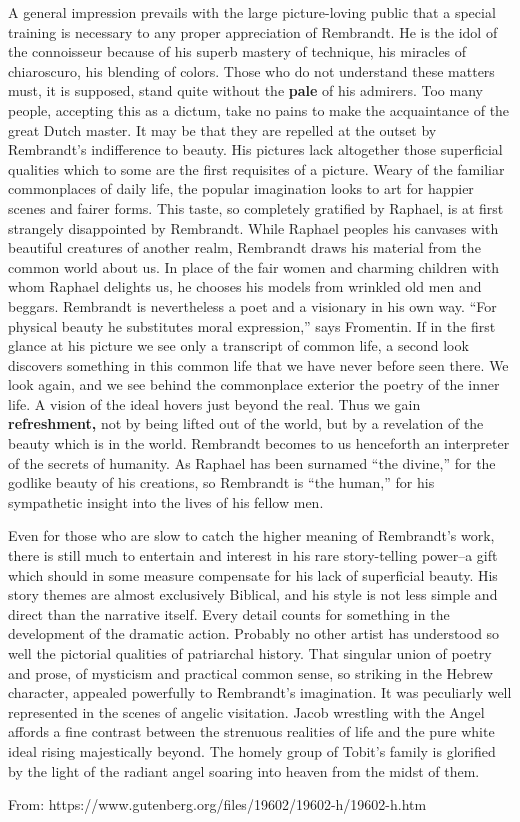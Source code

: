 \bigskip
\begin{linenumbers}
\modulolinenumbers[5]
\indent A general impression prevails with the large picture-loving public that a special training is necessary to any proper appreciation of Rembrandt. He is the idol of the connoisseur because of his superb mastery of technique, his miracles of chiaroscuro, his blending of colors. Those who do not understand these matters must, it is supposed, stand quite without the \textbf{pale} of his admirers. Too many people, accepting this as a dictum, take no pains to make the acquaintance of the great Dutch master. It may be that they are repelled at the outset by Rembrandt's indifference to beauty. His pictures lack altogether those superficial qualities which to some are the first requisites of a picture. Weary of the familiar commonplaces of daily life, the popular imagination looks to art for happier scenes and fairer forms. This taste, so completely gratified by Raphael, is at first strangely disappointed by Rembrandt. While Raphael peoples his canvases with beautiful creatures of another realm, Rembrandt draws his material from the common world about us. In place of the fair women and charming children with whom Raphael delights us, he chooses his models from wrinkled old men and beggars. Rembrandt is nevertheless a poet and a visionary in his own way. ``For physical beauty he substitutes moral expression,'' says Fromentin. If in the first glance at his picture we see only a transcript of common life, a second look discovers something in this common life that we have never before seen there. We look again, and we see behind the commonplace exterior the poetry of the inner life. A vision of the ideal hovers just beyond the real. Thus we gain \textbf{refreshment,} not by being lifted out of the world, but by a revelation of the beauty which is in the world. Rembrandt becomes to us henceforth an interpreter of the secrets of humanity. As Raphael has been surnamed ``the divine,'' for the godlike beauty of his creations, so Rembrandt is ``the human,'' for his sympathetic insight into the lives of his fellow men.

\indent Even for those who are slow to catch the higher meaning of Rembrandt's work, there is still much to entertain and interest in his rare story-telling power--a gift which should in some measure compensate for his lack of superficial beauty. His story themes are almost exclusively Biblical, and his style is not less simple and direct than the narrative itself. Every detail counts for something in the development of the dramatic action. Probably no other artist has understood so well the pictorial qualities of patriarchal history. That singular union of poetry and prose, of mysticism and practical common sense, so striking in the Hebrew character, appealed powerfully to Rembrandt's imagination. It was peculiarly well represented in the scenes of angelic visitation. Jacob wrestling with the Angel affords a fine contrast between the strenuous realities of life and the pure white ideal rising majestically beyond. The homely group of Tobit's family is glorified by the light of the radiant angel soaring into heaven from the midst of them.
\end{linenumbers}
From: https://www.gutenberg.org/files/19602/19602-h/19602-h.htm

